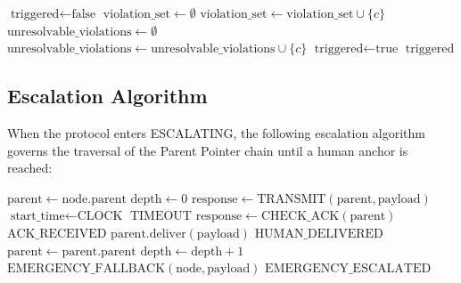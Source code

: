\begin{algorithm}[H]
\caption{Bailout Trigger Evaluation}
\label{alg:bailout-trigger}
\begin{algorithmic}
\State $\text{triggered} \gets \text{false}$
\State $\text{violation\_set} \gets \emptyset$
        \State $\text{violation\_set} \gets \text{violation\_set} \cup \{c\}$
    \EndIf
\EndFor
\State $\text{unresolvable\_violations} \gets \emptyset$
        \State $\text{unresolvable\_violations} \gets \text{unresolvable\_violations} \cup \{c\}$
    \EndIf
\EndFor
{}
    \State $\text{triggered} \gets \text{true}$
\EndIf
\State \Return $\text{triggered}$
\end{algorithmic}
\end{algorithm}

\subsection{Escalation Algorithm}
\label{sec:escalation-algorithm}

When the protocol enters ESCALATING, the following escalation algorithm governs the traversal of the Parent Pointer chain until a human anchor is reached:

\begin{algorithm}[H]
\caption{Bailout Escalation Algorithm}
\label{alg:escalation}
\begin{algorithmic}
    \State $\text{parent} \gets \text{node}.\text{parent}$
    \State $\text{depth} \gets 0$
        \State $\text{response} \gets \text{TRANSMIT}(\text{parent}, \text{payload})$
        \State $\text{start\_time} \gets \text{CLOCK}$
                \State \Return $\text{TIMEOUT}$
            \EndIf
            \State $\text{response} \gets \text{CHECK\_ACK}(\text{parent})$
        \EndWhile
            \State \Return $\text{ACK\_RECEIVED}$
        \EndIf
            \State {}
            \State $\text{parent}.\text{deliver}(\text{payload})$
            \State \Return $\text{HUMAN\_DELIVERED}$
        \EndIf
        \State $\text{parent} \gets \text{parent}.\text{parent}$
        \State $\text{depth} \gets \text{depth} + 1$
    \EndWhile
    \State {}
    \State $\text{EMERGENCY\_FALLBACK}(\text{node}, \text{payload})$
    \State \Return $\text{EMERGENCY\_ESCALATED}$
\EndFunction
\end{algorithmic}
\end{algorithm}

